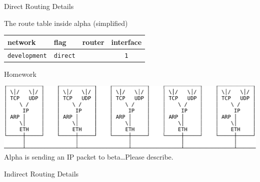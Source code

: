 \begin{frame}{Direct Routing Details}
  \begin{center}
  \end{center}

  \begin{block}{The route table inside alpha (simplified)}
    \begin{center}
      \begin{tabular}{llcc}
        \toprule
        network & flag & router & interface\\\midrule
        \texttt{development} & \texttt{direct} & & \texttt{1}\\\bottomrule
      \end{tabular}
    \end{center}
  \end{block}
\end{frame}

\begin{frame}{Homework}
  \begin{center}
    \includegraphics[width=\textwidth]{eth}\\[2em]
    Alpha is sending an IP packet to beta\ldots{}Please describe.
  \end{center}
\end{frame}
  
\begin{frame}{Indirect Routing Details}\label{indirect-routing-2}
  \begin{center}
  \end{center}
\end{frame}

